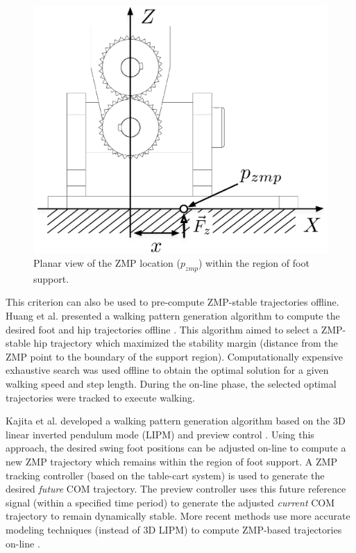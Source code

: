 \begin{figure}[!h]
	\begin{center}
    \includegraphics[scale=0.6]{fig/background/zmpfoot.eps}
	\end{center}
  \caption{Planar view of the ZMP location ($p_{zmp}$) within the region of foot support.}
  \label{fig:zmp}
\end{figure}

This criterion can also be used to pre-compute ZMP-stable trajectories offline. Huang et al. presented a walking pattern generation algorithm to compute the desired foot and hip trajectories offline \cite{HuangEtAlTRA2001}. This algorithm aimed to select a ZMP-stable hip trajectory which maximized the stability margin (distance from the ZMP point to the boundary of the support region). Computationally expensive exhaustive search was used offline to obtain the optimal solution for a given walking speed and step length. During the on-line phase, the selected optimal trajectories were tracked to execute walking.

Kajita et al. developed a walking pattern generation algorithm based on the 3D linear inverted pendulum mode (LIPM) \cite{Kajita:2001fk} and preview control \cite{KajitaEtAlICRA2003}. Using this approach, the desired swing foot positions can be adjusted on-line to compute a new ZMP trajectory which remains within the region of foot support. A ZMP tracking controller (based on the table-cart system) is used to generate the desired \emph{future} COM trajectory. The preview controller uses this future reference signal (within a specified time period) to generate the adjusted \emph{current} COM trajectory to remain dynamically stable. More recent methods use more accurate modeling techniques (instead of 3D LIPM) to compute ZMP-based trajectories on-line \cite{TakenakaEtAlIROS2009}. 

